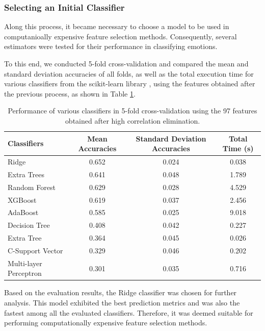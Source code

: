 \subsubsection{Selecting an Initial Classifier}

Along this process, it became necessary to choose a model to be used in computanioally expensive feature selection methods. Consequently, several estimators were tested for their performance in classifying emotions.

To this end, we conducted 5-fold cross-validation and compared the mean and standard deviation accuracies of all folds, as well as the total execution time for various classifiers from the scikit-learn library \cite{scikit-learn}, using the features obtained after the previous process, as shown in Table \ref{tab:modelsPerformance}.

\begin{table}[H]
	\caption{Performance of various classifiers in 5-fold cross-validation using the 97 features obtained after high correlation elimination.}
	\centering
	\label{tab:modelsPerformance}
	\begin{tabular}{lccc}
		\toprule
		Classifiers &   Mean Accuracies &   Standard Deviation Accuracies & Total Time (s)\\
		\midrule
		Ridge   &        0.652 &      0.024 & 0.038 \\
		Extra Trees   &        0.641 &      0.048 & 1.789 \\
		Random Forest &        0.629 &      0.028 & 4.529 \\
		XGBoost     &        0.619 &      0.037 & 2.456 \\
		AdaBoost   &        0.585 &      0.025 & 9.018 \\
		Decision Tree &        0.408 &      0.042 & 0.227 \\
		Extra Tree  &        0.364 &      0.045 & 0.026 \\
		C-Support Vector  &        0.329 &      0.046 & 0.202 \\
		Multi-layer Perceptron    &        0.301 &      0.035 & 0.716 \\
		\bottomrule
	\end{tabular}
\end{table}

Based on the evaluation results, the Ridge classifier was chosen for further analysis. This model exhibited the best prediction metrics and was also the fastest among all the evaluated classifiers. Therefore, it was deemed suitable for performing computationally expensive feature selection methods.


